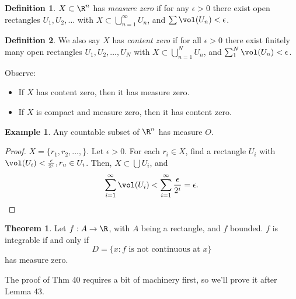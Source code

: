 \documentclass[a5paper]{article}
\theoremstyle{definition}%
\newtheorem{theorem}{Theorem}
\newtheorem*{definition*}{Definition}
\newtheorem*{example*}{Example}
\numberwithin{exercise}{section}
\theoremstyle{remark}%
\begin{document}
\begin{highlight}
\begin{definition*}
$X\subset\R^n$ has \emph{measure zero} if for any $\epsilon>0$ there exist open rectangles $U_1, U_2, \dots$ with $X\subset \bigcup_{n=1}^\infty U_n$, and $\sum \vol(U_n)<\epsilon$. 
\end{definition*}
\end{highlight}

\begin{highlight}
\begin{definition*}
We also say $X$ has \emph{content zero} if for all $\epsilon>0$ there exist finitely many open rectangles $U_1, U_2, \dots, U_N$ with $X\subset \bigcup_{n=1}^N U_n$, and $\sum_1^N \vol(U_n)<\epsilon$. 
\end{definition*}
\end{highlight}

\begin{highlight}
Observe:
\begin{itemize}
\item If $X$ has content zero, then it has measure zero. 
\item If $X$ is compact and measure zero, then it has content zero. 
\end{itemize}
\end{highlight}

\begin{highlight}
\begin{example*}
Any countable subset of $\R^n$ has measure $O$. 
\end{example*}
\end{highlight}
\begin{proof}
$X=\{r_1, r_2, \ldots, \}$. Let $\epsilon>0$. For each $r_i\in X$, find a rectangle $U_i$ with $\vol(U_i)<\frac{\epsilon}{2^i}, r_u\in U_i$. Then, $X\subset\bigcup U_i$, and 
$$\sum_{i=1}^\infty\vol(U_i)<\sum_{i=1}^\infty \frac{\epsilon}{2^i}=\epsilon.$$
\end{proof}

\begin{highlight}
\begin{theorem}
Let $f:A\to\R$, with $A$ being a rectangle, and $f$ bounded. $f$ is integrable if and only if 
$$D=\{x:f \text{ is not continuous at } x\}$$
has measure zero.
\end{theorem}
\end{highlight}
The proof of Thm 40 requires a bit of machinery first, so we'll prove it after Lemma 43. 
\end{document}
